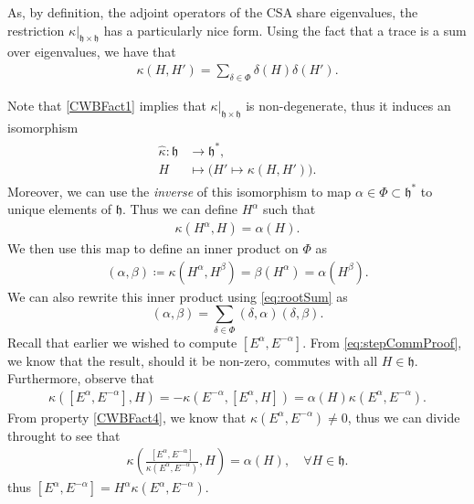 \documentclass[11pt,fleqn]{article}
\begin{document}
\begin{remark}
	As, by definition, the adjoint operators of the CSA share eigenvalues, the restriction $\kappa|_{\mathfrak{h} \times \mathfrak{h}}$ has a particularly nice form. Using the fact that a trace is a sum over eigenvalues, we have that
		\begin{align}\label{eq:rootSum}
			\kappa(H,H') = \sum_{\delta \in \Phi} \delta(H)\delta(H').
		\end{align}
\end{remark}
\begin{remark}
	Note that \ref{CWBFact1} implies that $\kappa|_{\mathfrak{h} \times \mathfrak{h}}$ is non-degenerate, thus it induces an isomorphism
		\begin{align}
		\begin{split}
			\hat{\kappa} : \mathfrak{h} &\to \mathfrak{h}^*, \\
						 		H &\mapsto \big(H' \mapsto \kappa(H,H')\big).
		\end{split}
		\end{align}
	Moreover, we can use the \textit{inverse} of this isomorphism to map $\alpha \in \Phi \subset \mathfrak{h}^*$ to unique elements of $\mathfrak{h}$. Thus we can define $H^\alpha$ such that
		\begin{align}
			\kappa \left( H^\alpha, H \right) = \alpha(H).
		\end{align}
	We then use this map to define an inner product on $\Phi$ as
		\begin{align}\label{eq:rootInnerProdDef}
			(\alpha, \beta) \coloneqq \kappa(H^\alpha, H^\beta) = \beta(H^\alpha) = \alpha (H^\beta).
		\end{align}
	We can also rewrite this inner product using \eqref{eq:rootSum} as
		\begin{equation}\label{eq:rootInnerProd}
			(\alpha, \beta) = \sum_{\delta \in \Phi} (\delta,\alpha)(\delta,\beta).
		\end{equation}
	Recall that earlier we wished to compute $[E^\alpha, E^{-\alpha}]$. From \eqref{eq:stepCommProof}, we know that the result, should it be non-zero, commutes with all $H \in \mathfrak{h}$. Furthermore, observe that
		\begin{align}
			\kappa([E^\alpha,E^{-\alpha}],H) = - \kappa(E^{-\alpha},[E^\alpha,H]) = \alpha(H) \kappa(E^\alpha,E^{-\alpha}).
		\end{align}
	From property \ref{CWBFact4}, we know that $\kappa(E^\alpha,E^{-\alpha}) \neq 0$, thus we can divide throught to see that
		\begin{align}
			\kappa\left( \frac{[E^\alpha, E^{-\alpha}]}{\kappa(E^\alpha,E^{-\alpha})} , H \right) = \alpha(H), \quad \forall H \in \mathfrak{h}.
		\end{align}
	thus $[E^\alpha,E^{-\alpha}] = H^\alpha \kappa(E^\alpha,E^{-\alpha})$.
\end{remark}
\end{document}
